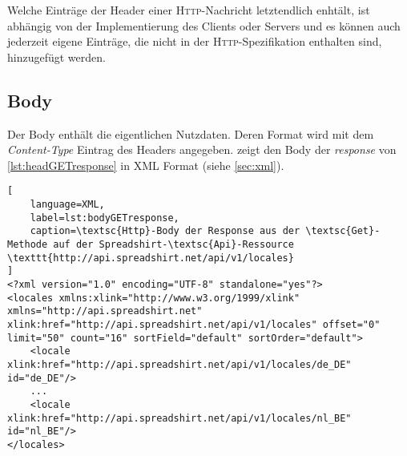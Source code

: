 Welche Einträge der Header einer \textsc{Http}-Nachricht letztendlich enhtält, ist abhängig von der Implementierung des Clients oder Servers und es können auch jederzeit eigene Einträge, die nicht in der \textsc{Http}-Spezifikation enthalten sind, hinzugefügt werden.

\subsection{Body}
\label{sec:http-body}

Der Body enthält die eigentlichen Nutzdaten. Deren Format wird mit dem \emph{Content-Type} Eintrag des Headers angegeben.  zeigt den Body der \emph{response} von \cref{lst:headGETresponse} in \gls{XML} Format (siehe \cref{sec:xml}).

\begin{lstlisting}[
    language=XML,
    label=lst:bodyGETresponse,
    caption=\textsc{Http}-Body der Response aus der \textsc{Get}-Methode auf der Spreadshirt-\textsc{Api}-Ressource \texttt{http://api.spreadshirt.net/api/v1/locales}
]
<?xml version="1.0" encoding="UTF-8" standalone="yes"?>
<locales xmlns:xlink="http://www.w3.org/1999/xlink" xmlns="http://api.spreadshirt.net" xlink:href="http://api.spreadshirt.net/api/v1/locales" offset="0" limit="50" count="16" sortField="default" sortOrder="default">
    <locale xlink:href="http://api.spreadshirt.net/api/v1/locales/de_DE" id="de_DE"/>
    ...
    <locale xlink:href="http://api.spreadshirt.net/api/v1/locales/nl_BE" id="nl_BE"/>
</locales>
\end{lstlisting}
